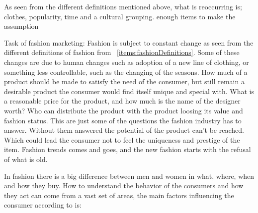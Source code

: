 As seen from the different definitions mentioned above, what is reoccurring is;
clothes, popularity, time and a cultural grouping. %
enough items to make the assumption

Task of fashion marketing:
Fashion is subject to constant change as seen from the different definitions of fashion from ~\ref{items:fashionDefinitions}.
Some of these changes are due to human changes such as adoption of a new line of clothing, or something less controllable, such as the changing of the seasons.
How much of a product should be made to satisfy the need of the consumer, but still remain a desirable product the consumer would find itself unique and special with.
What is a reasonable price for the product, and how much is the name of the designer worth?
Who can distribute the product with the product loosing its value and fashion status.
This are just some of the questions the fashion industry has to answer.
Without them answered the potential of the product can't be reached.
Which could lead the consumer not to feel the uniqueness and prestige of the item.
Fashion trends comes and goes, and the new fashion starts with the refusal of what is old.


In fashion there is a big difference between men and women in what, where, when
and how they buy.  How to understand the behavior of the consumers and how they
act can come from a vast set of areas, the main factors influencing the consumer according to \cite{kotler2009marketing} is: %

